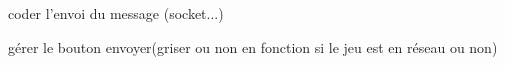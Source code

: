 
\begin{DoxyRefList}
\item[\label{todo__todo000001}%
\hypertarget{todo__todo000001}{}%
Espace de nommage \hyperlink{namespace_ui}{Ui} ]coder l'envoi du message (socket...) 

gérer le bouton envoyer(griser ou non en fonction si le jeu est en réseau ou non) 
\end{DoxyRefList}